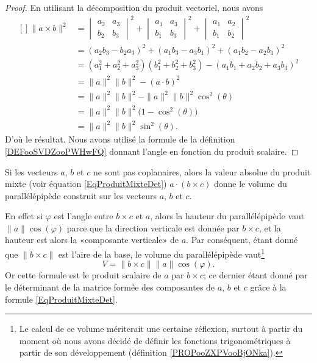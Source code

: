 \begin{proof}
    En utilisant la décomposition du produit vectoriel, nous avons
    \begin{equation}
        \begin{aligned}[]
            \| a\times b \|^2&=\begin{vmatrix}
                a_2    &   a_3    \\ 
                b_2    &   b_3    
            \end{vmatrix}^2+\begin{vmatrix}
                a_1    &   a_3    \\ 
                b_1    &   b_3    
            \end{vmatrix}^2+\begin{vmatrix}
                a_1    &   a_2    \\ 
                b_1    &   b_2    
            \end{vmatrix}^2\\
            &=(a_2b_3-b_2a_3)^2+(a_1b_3-a_3b_1)^2+(a_1b_2-a_2b_1)^2\\
            &=(a_1^2+a_2^2+a_3^2)(b_1^2+b_2^2+b_3^2)-(a_1b_1+a_2b_2+a_3b_3)^2\\
            &=\| a \|^2\| b \|^2-(a\cdot b)^2\\
            &=\| a \|^2\| b \|^2-\| a \|^2\| b \|^2\cos^2(\theta)\\
            &=\| a \|^2\| b \|^2\big( 1-\cos^2(\theta) \big)\\
            &=\| a \|^2\| b \|^2\sin^2(\theta).
        \end{aligned}
    \end{equation}
    D'où le résultat. Nous avons utilisé la formule de la définition \eqref{DEFooSVDZooPWHwFQ} donnant l'angle en fonction du produit scalaire.
\end{proof}

\begin{normaltext}      \label{NORMooWWOKooWzScnZ}
Si les vecteurs $a$, $b$ et $c$ ne sont pas coplanaires, alors la valeur absolue du produit mixte (voir équation \eqref{EqProduitMixteDet}) $a\cdot(b\times c)$ donne le volume du parallélépipède construit sur les vecteurs $a$, $b$ et $c$.

En effet si $\varphi$ est l'angle entre $b\times c$ et $a$, alors la hauteur du parallélépipède vaut $\| a \|\cos(\varphi)$ parce que la direction verticale est donnée par $b\times c$, et la hauteur est alors la «composante verticale» de $a$. Par conséquent, étant donné que $\| b\times c \|$ est l'aire de la base, le volume du parallélépipède vaut\footnote{Le calcul de ce volume mériterait une certaine réflexion, surtout à partir du moment où nous avons décidé de définir les fonctions trigonométriques à partir de son développement (définition \ref{PROPooZXPVooBjONka}).}
\begin{equation}
    V=\| b\times c\|  \| a \|\cos(\varphi).
\end{equation}
Or cette formule est le produit scalaire de $a$ par $b \times c$; ce dernier étant donné par le déterminant de la matrice formée des composantes de $a$, $b$ et $c$ grâce à la formule \eqref{EqProduitMixteDet}.
\end{normaltext}

